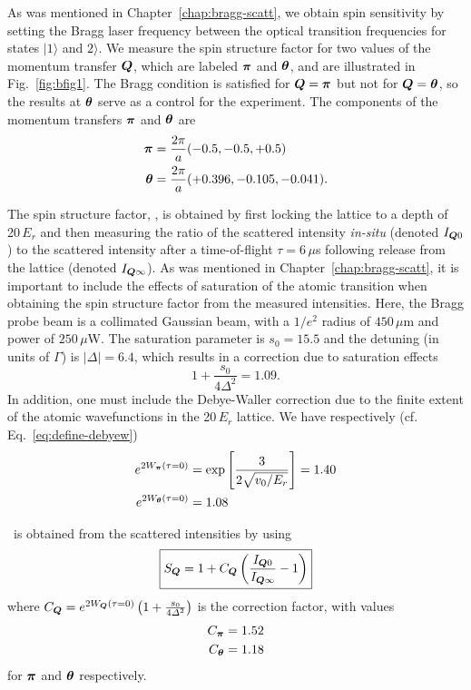 As was mentioned in Chapter~\ref{chap:bragg-scatt}, we obtain spin sensitivity
by setting the Bragg laser frequency between the optical transition frequencies
for states $|1\rangle$ and $2\rangle$.  We measure the spin structure factor
for two values of the momentum transfer $\bm{Q}$, which are labeled $\bm{\pi}$
and $\bm{\theta}$, and are illustrated in Fig.~\ref{fig:bfig1}.   The Bragg
condition is satisfied for $\bm{Q}=\bm{\pi}$ but not for $\bm{Q}=\bm{\theta}$,
so the results at $\bm{\theta}$ serve as a control for the experiment.    The
components of the momentum transfers $\bm{\pi}$ and $\bm{\theta}$ are 
\begin{align*} \bm{\pi} & =\frac{2\pi}{a}(-0.5,-0.5,+0.5) \\
\bm{\theta} & =\frac{2\pi}{a}(+0.396,-0.105,-0.041).
\end{align*} 
 
The spin structure factor, \sq, is obtained by first locking the lattice to a
depth of 20\,$E_{r}$ and then measuring the ratio of the scattered intensity
\textit{in-situ} (denoted $I_{\bm{Q}0}$) to the scattered intensity after a
time-of-flight $\tau=6\,\mu$s following release from the lattice (denoted
$I_{\bm{Q}\infty}$).  As was mentioned in Chapter~\ref{chap:bragg-scatt}, it is
important to include the effects of saturation of the atomic transition when
obtaining the spin structure factor from the measured intensities. Here, the
Bragg probe beam is a collimated Gaussian beam, with a $1/e^{2}$ radius of
$450\,\mu$m and power of $250\,\mu$W.  The saturation parameter is $s_{0}=15.5$
and the detuning (in units of $\Gamma$) is $|\Delta|=6.4$, which results in a
correction due to saturation effects 
\begin{equation}
  1 + \frac{s_{0}}{4\Delta^{2}} = 1.09.
\end{equation} In addition, one must include the Debye-Waller correction due to
the finite extent of the atomic wavefunctions in the 20\,$E_{r}$ lattice.   We
have respectively (cf. Eq.~\ref{eq:define-debyew}) 
\begin{align*}
 e^{2W_{\bm{\pi}}(\tau=0) }& = \exp\left[ \frac{3}{2\sqrt{v_{0}/E_{r}}} \right]
= 1.40 \\ e^{2W_{\bm{\theta}}(\tau=0)} & = 1.08 
\end{align*}
 
\sq\ is obtained from the scattered intensities by using 
\begin{equation} 
\boxed{
 \sq =  1 + C_{\bv{Q}}  
   \left( \frac{ I_{\bv{Q}0} }{ I_{\bv{Q}\infty}} - 1 \right) }
\vspace{0.8em}
\label{eq:correction-sq}
\end{equation}
where $C_{\bm{Q}}=e^{2W_{\bm{Q}}(\tau=0) }\left( 1 + \frac{ s_{0} }{ 4
\Delta^{2} } \right)$ is the correction factor, with values
\begin{align*}
 C_{\bm{\pi}} & = 1.52 \\ 
 C_{\bm{\theta}} & = 1.18  
\end{align*}
for $\bm{\pi}$ and $\bm{\theta}$ respectively. 

